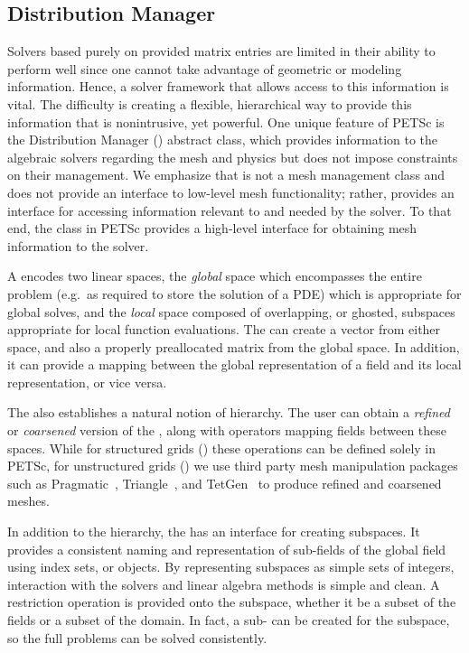 \documentclass[]{siamart0216}
\begin{document}
\subsection{Distribution Manager}
Solvers based purely on provided matrix entries are limited 
in their ability to perform well since one cannot take 
advantage of geometric or modeling information. Hence, a 
solver framework that allows access to this information is 
vital. The difficulty is creating a flexible, hierarchical way 
to provide this information that is nonintrusive, yet powerful. 
One unique feature of PETSc is the Distribution Manager () 
abstract class, which provides information to the algebraic 
solvers regarding the 
mesh and physics but does not impose constraints on their 
management. We emphasize that  is not a mesh management 
class and does not provide an interface to low-level mesh 
functionality; rather,  provides an interface for accessing information 
relevant to and needed by the solver.
To that end, the  class in PETSc provides a high-level
interface for obtaining mesh information to the solver.

A  encodes two linear spaces, the \textit{global} space which encompasses
the entire problem (e.g.~as required to store the solution of a PDE) which is
appropriate for global solves, and the \textit{local} space composed of overlapping,
or ghosted, subspaces appropriate for local function evaluations. The  can
create a vector from either space, and also a properly preallocated matrix from the
global space. In addition, it can provide a mapping between the global representation
of a field and its local representation, or vice versa.

The  also establishes a natural notion of hierarchy. The user can obtain a
\textit{refined} or \textit{coarsened} version of the , along with operators
mapping fields between these spaces. While for structured grids () these
operations can be defined solely in PETSc, for unstructured grids () we
use third party mesh manipulation packages such as Pragmatic~\cite{RokosGorman13}, Triangle~\cite{shewchuk96, triangle:homepage},
and TetGen~\cite{tetgen:homepage,Si2015} to produce refined and coarsened
meshes.

In addition to the hierarchy, the  has an interface for creating subspaces. It provides
a consistent naming and representation of sub-fields of the global field using index sets, or
 objects. By representing subspaces as simple sets of integers, interaction with
the solvers and linear algebra methods is simple and clean. A restriction operation is provided
onto the subspace, whether it be a subset of the fields or a subset of the domain. In fact,
a sub- can be created for the subspace, so the full problems can be solved consistently.
\end{document}
